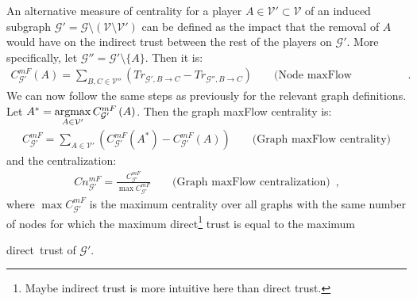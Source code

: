    An alternative measure of centrality for a player $A \in \mathcal{V}' \subset \mathcal{V}$ of an induced subgraph
    $\mathcal{G}' = \mathcal{G} \setminus \left(\mathcal{V} \setminus \mathcal{V}'\right)$ can be defined as the impact that
    the removal of $A$ would have on the indirect trust between the rest of the players on $\mathcal{G}'$. More specifically,
    let $\mathcal{G}'' = \mathcal{G}' \setminus \{A\}$. Then it is:
    \begin{align*}
      C^{mF}_{\mathcal{G}'}\left(A\right) = \sum\limits_{B,C \in \mathcal{V}''}\left(Tr_{\mathcal{G}', B \rightarrow C} -
      Tr_{\mathcal{G}'', B \rightarrow C}\right) && \mbox{ (Node maxFlow centrality)} \enspace.
    \end{align*}
    We can now follow the same steps as previously for the relevant graph definitions. Let $A^* = \operatorname*{argmax}\limits_{A \in
    \mathcal{V}'}C^{mF}_{\mathcal{G}'}\left(A\right)$. Then the graph maxFlow centrality is:
    \begin{align*}
      C^{mF}_{\mathcal{G}'} = \sum\limits_{A \in \mathcal{V}'}\left(C^{mF}_{\mathcal{G}'}\left(A^*\right) -
      C^{mF}_{\mathcal{G}'}\left(A\right)\right) && \mbox{ (Graph maxFlow centrality)}
    \end{align*}
    and the centralization:
    \begin{align*}
      Cn^{mF}_{\mathcal{G}'} = \frac{C^{mF}_{\mathcal{G}'}}{\max C^{mF}_{\mathcal{G}'}} && \mbox{ (Graph maxFlow
      centralization)} \enspace,
    \end{align*}
    where $\max C^{mF}_{\mathcal{G}'}$ is the maximum centrality over all graphs with the same number of nodes for which the
    maximum direct\footnote{Maybe indirect trust is more intuitive here than direct trust.} trust is equal to the maximum
    \addtocounter{footnote}{-1} direct\footnotemark \ trust of $\mathcal{G}'$.
